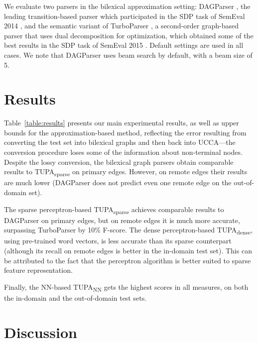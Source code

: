 \documentclass[11pt]{article}
\newcommand{\parser}[1]{TUPA\textsubscript{#1}}
\newcommand{\tabref}[1]{Table~\ref{#1}}
\begin{document}
We evaluate two parsers in the bilexical approximation setting:
DAGParser \cite{ribeyre-villemontedelaclergerie-seddah:2014:SemEval}, the leading transition-based parser which participated in the SDP task of SemEval 2014 \cite{oepen2014semeval},
and the semantic variant of TurboParser \cite{almeida-martins:2015:SemEval},
a second-order graph-based parser that uses dual decomposition for optimization,
which obtained some of the best results in the SDP task of SemEval 2015 \cite{oepen2015semeval}. Default settings are used in all cases.
We note that DAGParser uses beam search by default, with a beam size of 5.



\section{Results}\label{sec:results}

\tabref{table:results} presents our main experimental results, as well as
upper bounds for the approximation-based method,
reflecting the error resulting from converting the test set into bilexical graphs and then
back into UCCA---the conversion procedure loses some of the information about non-terminal nodes.
Despite the lossy conversion, the bilexical graph parsers obtain comparable results to
\parser{sparse}
on primary edges. However, on remote edges their results are much lower
(DAGParser does not predict even one remote edge on the out-of-domain set).

The sparse perceptron-based \parser{sparse} achieves comparable results to DAGParser on primary edges, but on remote edges it is much more accurate, surpassing TurboParser by 10\% F-score.
The dense perceptron-based \parser{dense}, using pre-trained word vectors, is less accurate
than its sparse counterpart (although its recall on remote edges is better in the in-domain
test set). This can be attributed to the fact that the perceptron algorithm is better suited to
sparse feature representation.

Finally, the NN-based \parser{NN} gets the highest scores in all measures, on both
the in-domain and the out-of-domain test sets.

\section{Discussion}\label{sec:discussion}
\end{document}
